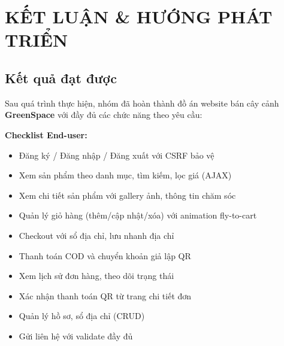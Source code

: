\documentclass[a4paper]{article}
\begin{document}
\section*{KẾT LUẬN \& HƯỚNG PHÁT TRIỂN}

\subsection*{Kết quả đạt được}

Sau quá trình thực hiện, nhóm đã hoàn thành đồ án website bán cây cảnh \textbf{GreenSpace} với đầy đủ các chức năng theo yêu cầu:

\textbf{Checklist End-user:}
\begin{itemize}
    \item[$\checkmark$] Đăng ký / Đăng nhập / Đăng xuất với CSRF bảo vệ
    \item[$\checkmark$] Xem sản phẩm theo danh mục, tìm kiếm, lọc giá (AJAX)
    \item[$\checkmark$] Xem chi tiết sản phẩm với gallery ảnh, thông tin chăm sóc
    \item[$\checkmark$] Quản lý giỏ hàng (thêm/cập nhật/xóa) với animation fly-to-cart
    \item[$\checkmark$] Checkout với sổ địa chỉ, lưu nhanh địa chỉ
    \item[$\checkmark$] Thanh toán COD và chuyển khoản giả lập QR
    \item[$\checkmark$] Xem lịch sử đơn hàng, theo dõi trạng thái
    \item[$\checkmark$] Xác nhận thanh toán QR từ trang chi tiết đơn
    \item[$\checkmark$] Quản lý hồ sơ, sổ địa chỉ (CRUD)
    \item[$\checkmark$] Gửi liên hệ với validate đầy đủ
\end{itemize}
\end{document}
